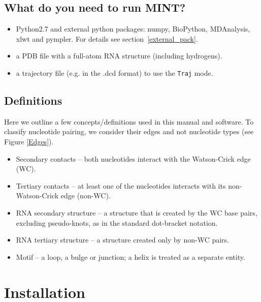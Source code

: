 \documentclass[12pt]{article}
\begin{document}
\subsection{What do you need to run MINT?}
\begin{itemize}
\item Python2.7 and external python packages: numpy, BioPython, MDAnalysis, xlwt and pympler. For details see section~\ref{external_pack}.
\item a PDB file with a full-atom RNA structure (including hydrogens).
\item a trajectory file (e.g. in the .dcd format) to use the \texttt{Traj} mode.
\end{itemize}

\subsection{Definitions}
Here we outline a few concepts/definitions used in this manual and software. To classify nucleotide pairing, we consider their edges and not nucleotide types (see Figure \ref{Edges}). 
\begin{itemize} 
\item Secondary contacts -- both nucleotides interact with the Watson-Crick edge (WC).
\item Tertiary contacts -- at least one of the nucleotides interacts with its non-Watson-Crick edge (non-WC).
\item RNA secondary structure -- a structure that is created by the WC base pairs, excluding pseudo-knots, as in the standard dot-bracket notation.
\item RNA tertiary structure -- a structure created only by non-WC pairs.
\item Motif -- a loop, a bulge or junction; a helix is treated as a separate entity.
\end{itemize}

\section{Installation} \label{external}
\end{document}

